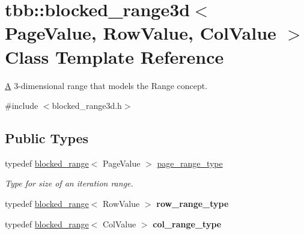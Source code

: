 \hypertarget{classtbb_1_1blocked__range3d}{}\section{tbb\+:\+:blocked\+\_\+range3d$<$ Page\+Value, Row\+Value, Col\+Value $>$ Class Template Reference}
\label{classtbb_1_1blocked__range3d}


\hyperlink{structA}{A} 3-\/dimensional range that models the Range concept.  




{\ttfamily \#include $<$blocked\+\_\+range3d.\+h$>$}

\subsection*{Public Types}
\begin{DoxyCompactItemize}
\item 
\hypertarget{classtbb_1_1blocked__range3d_a8cdc866378a12ce198da870d0439676f}{}typedef \hyperlink{classtbb_1_1blocked__range}{blocked\+\_\+range}$<$ Page\+Value $>$ \hyperlink{classtbb_1_1blocked__range3d_a8cdc866378a12ce198da870d0439676f}{page\+\_\+range\+\_\+type}\label{classtbb_1_1blocked__range3d_a8cdc866378a12ce198da870d0439676f}

\begin{DoxyCompactList}\small\item\em Type for size of an iteration range. \end{DoxyCompactList}\item 
\hypertarget{classtbb_1_1blocked__range3d_abe15e1e06f47809a477272f733a8abf8}{}typedef \hyperlink{classtbb_1_1blocked__range}{blocked\+\_\+range}$<$ Row\+Value $>$ {\bfseries row\+\_\+range\+\_\+type}\label{classtbb_1_1blocked__range3d_abe15e1e06f47809a477272f733a8abf8}

\item 
\hypertarget{classtbb_1_1blocked__range3d_ab3bffd5ffb14ad9897b1a9bf22980768}{}typedef \hyperlink{classtbb_1_1blocked__range}{blocked\+\_\+range}$<$ Col\+Value $>$ {\bfseries col\+\_\+range\+\_\+type}\label{classtbb_1_1blocked__range3d_ab3bffd5ffb14ad9897b1a9bf22980768}

\end{DoxyCompactItemize}
